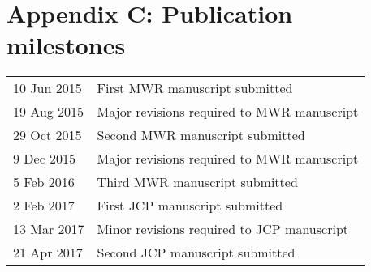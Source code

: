 \documentclass[a4paper,11pt]{article}
\begin{document}
\section*{Appendix C: Publication milestones}

\begin{tabular}{l l}
10 Jun 2015 & First MWR manuscript submitted \\
19 Aug 2015 & Major revisions required to MWR manuscript \\
29 Oct 2015 & Second MWR manuscript submitted\\
9 Dec 2015 & Major revisions required to MWR manuscript \\
5 Feb 2016 & Third MWR manuscript submitted
	\vspace*{1em} \\
2 Feb 2017 & First JCP manuscript submitted \\
13 Mar 2017 & Minor revisions required to JCP manuscript \\
21 Apr 2017 & Second JCP manuscript submitted \\
\end{tabular}
\end{document}
